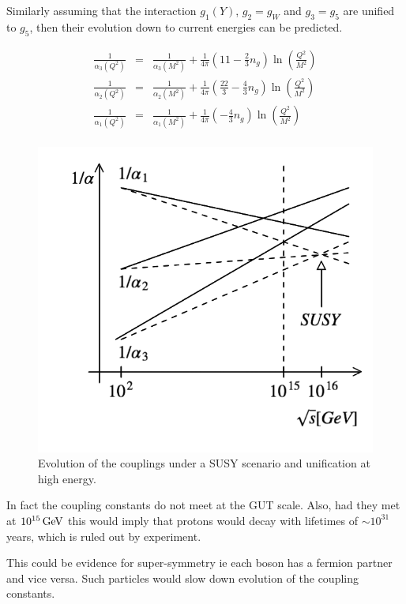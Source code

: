 Similarly assuming that the interaction $g_1(Y)$, $g_2 = g_W$ and $g_3 = g_5$ are unified to $g_5$, then their evolution down to current energies can be predicted.

\begin{eqnarray*}
  \frac{1}{\alpha_3(Q^2)} & = & \frac{1}{\alpha_3(M^2)} + \frac{1}{4\pi}\left(11 - \frac{2}{3}n_g\right) \ln\left(\frac{Q^2}{M^2}\right) \\
  \frac{1}{\alpha_2(Q^2)} & = & \frac{1}{\alpha_2(M^2)} + \frac{1}{4\pi}\left(\frac{22}{3} - \frac{4}{3}n_g\right) \ln\left(\frac{Q^2}{M^2}\right) \\
  \frac{1}{\alpha_1(Q^2)} & = & \frac{1}{\alpha_1(M^2)} + \frac{1}{4\pi}\left( - \frac{4}{3}n_g\right) \ln\left(\frac{Q^2}{M^2}\right) \\
\end{eqnarray*}

\begin{figure}[!htb]
  \begin{center}
    \includegraphics[width=\textwidth]{images/web_feynman/image_86.png}
    \caption[SUSY and unification at high energy]{Evolution of the couplings under a SUSY scenario and unification at high energy.}
    \label{fig:ch16_SUSYUnification}
  \end{center}
\end{figure}

In fact the coupling constants do not meet at the GUT scale. Also, had they met at $10^{15}\mathrm{\,GeV}$ this would imply that protons would decay with lifetimes of $\sim 10^{31}$ years, which is ruled out by experiment.

This could be evidence for super-symmetry ie each boson has a fermion partner and vice versa.  Such particles would slow down evolution of the coupling constants.
